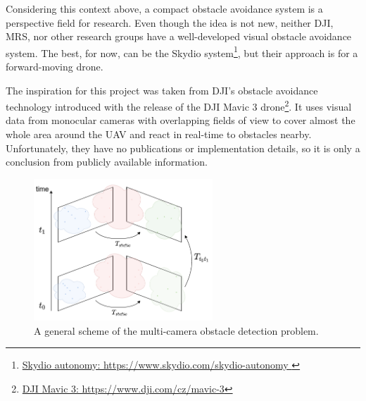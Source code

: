 Considering this context above, a compact obstacle avoidance system is a perspective field for research. 
Even though the idea is not new, neither DJI, MRS, nor other research groups have a well-developed visual obstacle avoidance system. 
The best, for now, can be the Skydio system\footnote{\href{https://www.skydio.com/skydio-autonomy}{Skydio autonomy: https://www.skydio.com/skydio-autonomy }}, but their approach is for a forward-moving drone.

The inspiration for this project was taken from DJI's obstacle avoidance technology introduced with the release of the DJI Mavic 3 drone\footnote{\href{https://www.dji.com/cz/mavic-3}{DJI Mavic 3: https://www.dji.com/cz/mavic-3}}. 
It uses visual data from monocular cameras with overlapping fields of view to cover almost the whole area around the UAV and react in real-time to obstacles nearby. 
Unfortunately, they have no publications or implementation details, so it is only a conclusion from publicly available information.

\begin{figure}[t]
    \centering
    \includegraphics[width=0.6\textwidth]{graphics/general_scheme.png}
    \caption{ A general scheme of the multi-camera obstacle detection problem.}
    \label{fig:intro_general}
\end{figure}

